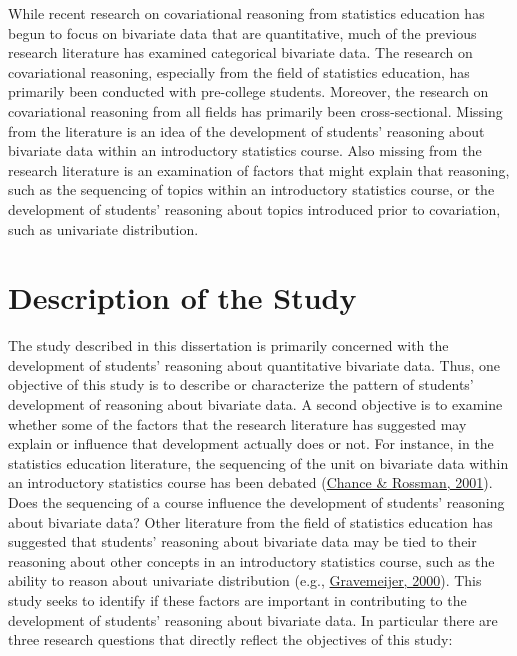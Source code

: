 \documentclass[11pt]{umnthesis}
\begin{document}
While recent research on covariational reasoning from statistics education has begun to focus on bivariate data that are quantitative, much of the previous research literature has examined categorical bivariate data. The research on covariational reasoning, especially from the field of statistics education, has primarily been conducted with pre-college students. Moreover, the research on covariational reasoning from all fields has primarily been cross-sectional. Missing from the literature is an idea of the development of students' reasoning about bivariate data within an introductory statistics course. Also missing from the research literature is an examination of factors that might explain that reasoning, such as the sequencing of topics within an introductory statistics course, or the development of students' reasoning about topics introduced prior to covariation, such as univariate distribution.

\hypertarget{description-of-the-study}{%
\section{Description of the Study}\label{description-of-the-study}}

The study described in this dissertation is primarily concerned with the development of students' reasoning about quantitative bivariate data. Thus, one objective of this study is to describe or characterize the pattern of students' development of reasoning about bivariate data. A second objective is to examine whether some of the factors that the research literature has suggested may explain or influence that development actually does or not. For instance, in the statistics education literature, the sequencing of the unit on bivariate data within an introductory statistics course has been debated (\protect\hyperlink{ref-chance:2001}{Chance \& Rossman, 2001}). Does the sequencing of a course influence the development of students' reasoning about bivariate data? Other literature from the field of statistics education has suggested that students' reasoning about bivariate data may be tied to their reasoning about other concepts in an introductory statistics course, such as the ability to reason about univariate distribution (e.g., \protect\hyperlink{ref-gravemeijer:2000}{Gravemeijer, 2000}). This study seeks to identify if these factors are important in contributing to the development of students' reasoning about bivariate data. In particular there are three research questions that directly reflect the objectives of this study:
\end{document}
